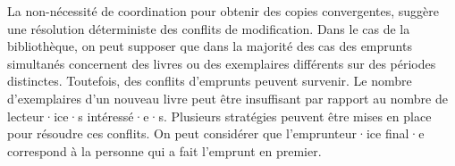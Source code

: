 %
%
%
%

La non-nécessité de coordination pour obtenir des copies convergentes, suggère une résolution déterministe des conflits de modification.
Dans le cas de la bibliothèque, on peut supposer que dans la majorité des cas des emprunts simultanés concernent des livres ou des exemplaires différents sur des périodes distinctes.
Toutefois, des conflits d'emprunts peuvent survenir.
Le nombre d'exemplaires d'un nouveau livre peut être insuffisant par rapport au nombre de lecteur·ice·s intéressé·e·s.
Plusieurs stratégies peuvent être mises en place pour résoudre ces conflits.
On peut considérer que l'emprunteur·ice final·e correspond à la personne qui a fait l'emprunt en premier.

